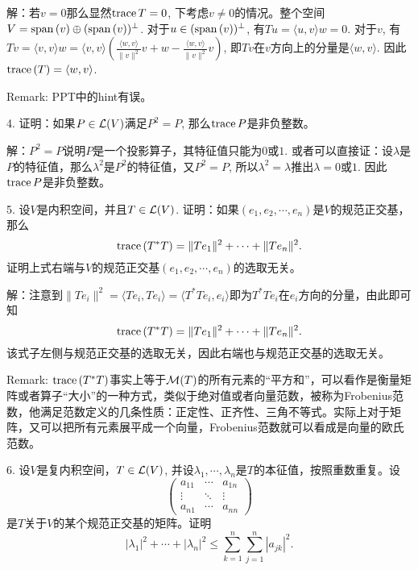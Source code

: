 \documentclass[hyperref,]{ctexart}
\begin{document}
\noindent{} 解：若\(v=0\)那么显然\(\mathrm{trace}\, T=0\),
下考虑\(v\ne 0\)的情况。整个空间\(V=\mathrm{span}\,(v)\oplus(\mathrm{span}\,(v))^{\perp}\).
对于\(u\in(\mathrm{span}\,(v))^{\perp}\), 有\(Tu=\langle u,v\rangle w=0\).
对于\(v\),
有\(Tv=\langle v,v\rangle w=\langle v,v\rangle (\frac{\langle w,v\rangle}{\|v\|^2}v+w-\frac{\langle w,v\rangle}{\|v\|^2}v)\),
即\(Tv\)在\(v\)方向上的分量是\(\langle w,v\rangle\).
因此\(\mathrm{trace}\,(T)=\langle w,v\rangle\).

\smallskip

\noindent{} Remark: PPT中的hint有误。

\bigskip

\noindent{} 4. 证明：如果\(P\in\mathcal{L}(V)\)满足\(P^2=P\),
那么\(\mathrm{trace}\, P\)是非负整数。

\smallskip

\noindent{}
解：\(P^2=P\)说明\(P\)是一个投影算子，其特征值只能为\(0\)或\(1\).
或者可以直接证：设\(\lambda\)是\(P\)的特征值，那么\(\lambda^2\)是\(P^2\)的特征值，又\(P^2=P\),
所以\(\lambda^2=\lambda\)推出\(\lambda=0\)或\(1\).
因此\(\mathrm{trace}\, P\)是非负整数。

\bigskip

\noindent{} 5. 设\(V\)是内积空间，并且\(T\in\mathcal{L}(V)\).
证明：如果\((e_1,e_2,\cdots,e_n)\)是\(V\)的规范正交基，那么
\[\mathrm{trace}\,(T^*T)=\|Te_1\|^2+\cdots+\|Te_n\|^2.\]
证明上式右端与\(V\)的规范正交基\((e_1,e_2,\cdots,e_n)\)的选取无关。

\smallskip

\noindent{}
解：注意到\(\|Te_i\|^2=\langle Te_i,Te_i\rangle = \langle T^*Te_i,e_i\rangle\)即为\(T^*Te_i\)在\(e_i\)方向的分量，由此即可知
\[\mathrm{trace}\,(T^*T)=\|Te_1\|^2+\cdots+\|Te_n\|^2.\]
该式子左侧与规范正交基的选取无关，因此右端也与规范正交基的选取无关。

\smallskip

\noindent{} Remark:
\(\mathrm{trace}\,(T^*T)\)事实上等于\(\mathcal{M}(T)\)的所有元素的``平方和''，可以看作是衡量矩阵或者算子``大小''的一种方式，类似于绝对值或者向量范数，被称为Frobenius范数，他满足范数定义的几条性质：正定性、正齐性、三角不等式。实际上对于矩阵，又可以把所有元素展平成一个向量，Frobenius范数就可以看成是向量的欧氏范数。

\bigskip

\noindent{} 6. 设\(V\)是复内积空间，\(T\in\mathcal{L}(V)\),
并设\(\lambda_1,\cdots,\lambda_n\)是\(T\)的本征值，按照重数重复。设 \[
\begin{pmatrix}
a_{11} & \cdots & a_{1n} \\
\vdots &\ddots&\vdots\\
a_{n1} &\cdots & a_{nn}
\end{pmatrix}
\] 是\(T\)关于\(V\)的某个规范正交基的矩阵。证明
\[|\lambda_1|^2+\cdots+|\lambda_n|^2\le\sum_{k=1}^n\sum_{j=1}^n|a_{jk}|^2.\]
\end{document}
